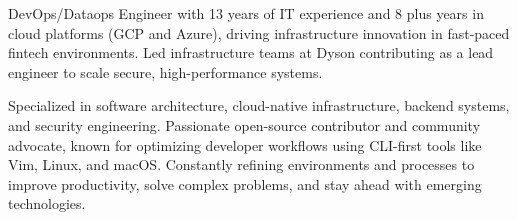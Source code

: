

\begin{cvparagraph}

DevOps/Dataops Engineer with 13 years of IT experience and 8 plus years in cloud platforms (GCP and Azure), driving infrastructure innovation in fast-paced fintech environments. Led infrastructure teams at Dyson contributing as a lead engineer to scale secure, high-performance systems.

Specialized in software architecture, cloud-native infrastructure, backend systems, and security engineering. Passionate open-source contributor and community advocate, known for optimizing developer workflows using CLI-first tools like Vim, Linux, and macOS. Constantly refining environments and processes to improve productivity, solve complex problems, and stay ahead with emerging technologies.
\end{cvparagraph}
